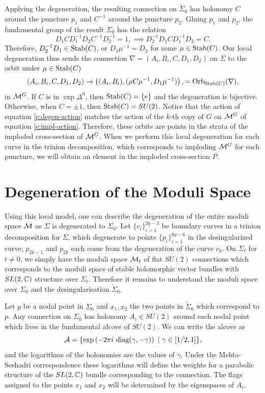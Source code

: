 	Applying the degeneration, the resulting connection on $\tilde{\Sigma}_0$ has holonomy $C$ around the puncture $p_1$ and $C^{-1}$ around the puncture $p_2$. Gluing $p_1$ and $p_2$, the fundamental group of the result $\Sigma_0$ has the relation
	\begin{equation}
	 D_1CD_1^{-1}D_2C^{-1}D_2^{-1} = 1, \implies D_2^{-1}D_1CD_1^{-1}D_2 = C.
	\end{equation}
	Therefore, $D_2^{-1}D_1 \in \text{Stab}(C)$, or $D_1\mu^{-1} = D_2$ for some $\mu\in \text{Stab}(C)$. Our local degeneration thus sends the connection $\nabla = (A_i,B_i,C,D_1,D_2)$ on $\Sigma$ to the orbit under $\mu \in \text{Stab}(C)$
	\begin{equation}
		\label{e:degen-action}
		(A_i,B_i,C,D_1,D_2) \to \left(
		(A_i,B_i), (\mu C \mu^{-1}, D_1\mu^{-1})\right), 
		= \text{Orb}_{\text{Stab} (C)} (\nabla),
	\end{equation}
	in $\mathcal{M}^G$. If $C$ is in $\exp \Delta^0$, then $\text{Stab}(C) = \{e\}$ and the degeneration is bijective. Otherwise, when $C = \pm 1$, then $\text{Stab}(C) = SU(2)$. Notice that the action of equation \ref{e:degen-action} matches the action of the $k$-th copy of $G$ on $\mathcal{M}^G$ of equation \ref{e:impl-action}. Therefore, these orbits are points in the strata of the imploded cross-section of $\mathcal{M}^G$. When we perform this local degeneration for each curve in the trinion decomposition, which corresponds to imploding $\mathcal{M}^G$ for each puncture, we will obtain an element in the imploded cross-section $P$. 
 	
\section{Degeneration of the Moduli Space}
	Using this local model, one can describe the degeneration of the entire moduli space $\mathcal{M}$ as $\Sigma$ is degenerated to $\Sigma_0$. Let $\{c_i\}_{i=1}^{3g-3}$ be boundary curves in a trinion decomposition for $\Sigma$, which degenerate to points $\{p_i\}_{i=1}^{6g-6}$ in the desingularized curve; $p_{2k-1}$ and $p_{2k}$ each come from the degeneration of the curve $c_k$. On $\Sigma_t$ for $t\neq 0$, we simply have the moduli space $\mathcal{M}_t$ of flat $SU(2)$ connections which corresponds to the moduli space of stable holomorphic vector bundles with $SL(2,\mathbb{C})$ structure over $\Sigma_t$. Therefore it remains to understand the moduli space over $\Sigma_0$ and the desingularisation $\tilde{\Sigma}_0$. 
	
	Let $p$ be a nodal point in $\Sigma_0$ and $x_1,x_2$ the two points in $\tilde{\Sigma}_0$ which correspond to $p$. Any connection on $\Sigma_0$ has holonomy $A_i\in SU(2)$ around each nodal point which lives in the fundamental alcove of $SU(2)$. We can write the alcove as
	\begin{equation}
		\mathcal{A} = \{\exp\left(
		-2\pi i ~\text{diag}(\gamma, -\gamma)
		\right)~|~ \gamma \in[1/2,1]\},
	\end{equation}
	and the logarithms of the holonomies are the values of $\gamma$. Under the Mehta-Seshadri correspondence these logarithms will define the weights for a parabolic structure of the $SL(2,\mathbb{C})$ bundle corresponding to the connection. The flags assigned to the points $x_1$ and $x_2$ will be determined by the eigenspaces of $A_i$.
	
